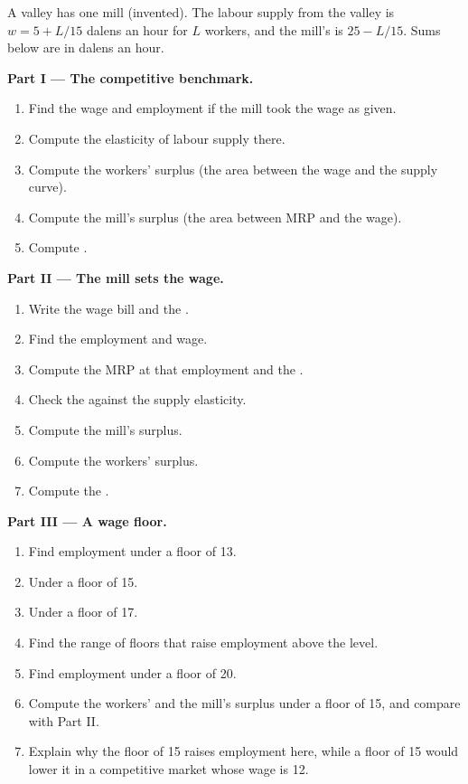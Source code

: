 \begin{problem}\label{pb:b1:factor-markets:mill}
A valley has one mill (invented). The labour supply from the valley is
$w = 5 + L/15$ dalens an hour for $L$ workers, and the mill's  is $25 - L/15$. Sums below are in dalens an hour.

\medskip\noindent\textbf{Part I --- The competitive benchmark.}
\begin{enumerate}
  \item Find the wage and employment if the mill took the wage as given.
  \item Compute the elasticity of labour supply there.
  \item Compute the workers' surplus (the area between the wage and the supply curve).
  \item Compute the mill's surplus (the area between MRP and the wage).
  \item Compute .
\end{enumerate}

\medskip\noindent\textbf{Part II --- The mill sets the wage.}
\begin{enumerate}[resume]
  \item Write the wage bill and the .
  \item Find the  employment and wage.
  \item Compute the MRP at that employment and the .
  \item Check the  against the supply elasticity.
  \item Compute the mill's surplus.
  \item Compute the workers' surplus.
  \item Compute the .
\end{enumerate}

\medskip\noindent\textbf{Part III --- A wage floor.}
\begin{enumerate}[resume]
  \item Find employment under a floor of 13.
  \item Under a floor of 15.
  \item Under a floor of 17.
  \item Find the range of floors that raise employment above the  level.
  \item Find employment under a floor of 20.
  \item Compute the workers' and the mill's surplus under a floor of 15, and compare with Part II.
  \item Explain why the floor of 15 raises employment here, while a floor of 15 would lower it in a competitive market whose wage is 12.
\end{enumerate}


\end{problem}
